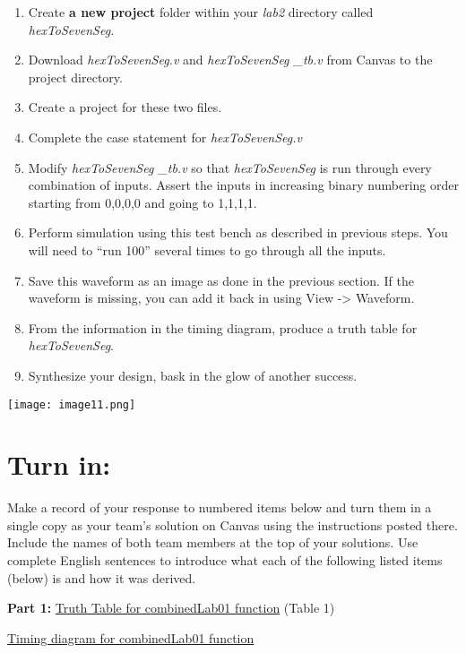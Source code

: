 \begin{enumerate}
\def\labelenumi{\arabic{enumi}.}
\setcounter{enumi}{1}
\item
  Create \textbf{a new project} folder within your \emph{lab2} directory
  called \emph{hexToSevenSeg.}
\item
  Download \emph{hexToSevenSeg.v} and \emph{hexToSevenSeg \_tb.v} from
  Canvas to the project directory.
\item
  Create a project for these two files.
\item
  \protect\hypertarget{Hex2Seven_Verilog}{}{}Complete the case statement
  for \emph{hexToSevenSeg.v}
\item
  Modify \emph{hexToSevenSeg \_tb.v} so that \emph{hexToSevenSeg} is run
  through every combination of inputs. Assert the inputs in increasing
  binary numbering order starting from 0,0,0,0 and going to 1,1,1,1.
\item
  Perform simulation using this test bench as described in previous
  steps. You will need to ``run 100'' several times to go through all
  the inputs.
\item
  \protect\hypertarget{Hex2Seven_Waveform}{}{}Save this waveform as an
  image as done in the previous section. If the waveform is missing, you
  can add it back in using View -\textgreater{} Waveform.
\item
  From the information in the timing diagram, produce a truth table for
  \emph{hexToSevenSeg}.
\item
  Synthesize your design, bask in the glow of another success.
\end{enumerate}

\texttt{[image: image11.png]}

\hypertarget{turn-in}{%
\section{Turn in:}\label{turn-in}}

Make a record of your response to numbered items below and turn them in
a single copy as your team's solution on Canvas using the instructions
posted there. Include the names of both team members at the top of your
solutions. Use complete English sentences to introduce what each of the
following listed items (below) is and how it was derived.

\textbf{Part 1:} \protect\hyperlink{CombinedLab01_Waveform}{Truth Table
for combinedLab01 function} (Table 1)

\protect\hyperlink{CombinedLab01_Waveform}{Timing diagram for
combinedLab01 function}

